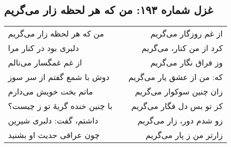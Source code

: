 \begin{center}
\section*{غزل شماره ۱۹۳: من که هر لحظه زار می‌گریم}
\label{sec:193}
\begin{longtable}{l p{0.5cm} r}
من که هر لحظه زار می‌گریم
&&
از غم روزگار می‌گریم
\\
دلبری بود در کنار مرا
&&
کرد از من کنار، می‌گریم
\\
از غم غمگسار می‌نالم
&&
وز فراق نگار می‌گریم
\\
دوش با شمع گفتم از سر سوز
&&
که: من از عشق یار می‌گریم
\\
ماتم بخت خویش می‌دارم
&&
زان چنین سوکوار می‌گریم
\\
با چنین خنده گریهٔ تو ز چیست؟
&&
کز تو بس دل فگار می‌گریم
\\
داشتم، گفت: دلبری شیرین
&&
زو شدم دور، زار می‌گریم
\\
چون عراقی حدیث او بشنید
&&
زارتر من ز پار می‌گریم
\\
\end{longtable}
\end{center}
